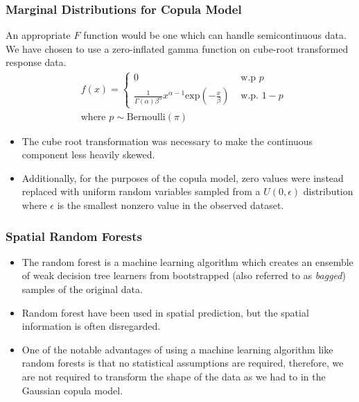 \documentclass{beamer}
\begin{document}
\begin{frame}
	\frametitle{Marginal Distributions for Copula Model}
	An appropriate $F$ function would be one which can handle semicontinuous data.
	We have chosen to use a zero-inflated gamma function on cube-root transformed response data.
	\begin{align*}
	&f(x) = 
	\begin{cases}
		0 & \text{ w.p } p \\
		\frac{1}{\Gamma(\alpha) \beta^\alpha} x^{\alpha -1} \text{exp}\left(-\frac{x}{\beta}\right) & \text{ w.p. } 1 - p 
	\end{cases} 
	\\
	&\text{where } p \sim \text{Bernoulli}(\pi)
	\end{align*}
	\begin{itemize}
	\item The cube root transformation was necessary to make the continuous component less heavily skewed.
	\item Additionally, for the purposes of the copula model, zero values were instead replaced with uniform random variables sampled from a $U(0, \epsilon)$ distribution where $\epsilon$ is the smallest nonzero value in the observed dataset.
	\end{itemize}
\end{frame}

\begin{frame}
	\frametitle{Spatial Random Forests}
	\begin{itemize}
		\item The random forest is a machine learning algorithm which creates an ensemble of weak decision tree learners from bootstrapped (also referred to as \textit{bagged}) samples of the original data\cite{breiman01}.
		\item Random forest have been used in spatial prediction, but the spatial information is often disregarded\cite{hengl18}.
		\item One of the notable advantages of using a machine learning algorithm like random forests is that no statistical assumptions are required, therefore, we are not required to transform the shape of the data as we had to in the Gaussian copula model.
	\end{itemize}
\end{frame}
\end{document}
